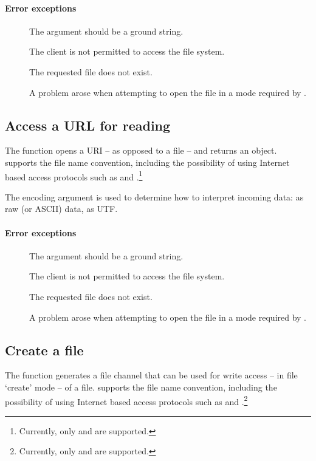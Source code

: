 \paragraph{Error exceptions}
\begin{description}
\item[]
The  argument should be a ground string.
\item[]
The client is not permitted to access the file system.
\item[]
The requested file does not exist.
\item[]
A problem arose when attempting to open the file in a mode required by \go.
\end{description}

\subsection{Access a URL for reading}
\label{io:openURL}
The  function opens a URI -- as opposed to a file -- and returns an  object.  supports the \go file name convention, including the possibility of using Internet based access protocols such as  and .\footnote{Currently, only  and  are supported.}

The encoding argument is used to determine how to interpret incoming data: as raw (or ASCII) data, as UTF.

\paragraph{Error exceptions}
\begin{description}
\item[]
The  argument should be a ground string.
\item[]
The client is not permitted to access the file system.
\item[]
The requested file does not exist.
\item[]
A problem arose when attempting to open the file in a mode required by \go.
\end{description}

\subsection{Create a file}
\label{io:openOutFile}
The  function generates a file channel that can be used for write access -- in file `create' mode -- of a file.  supports the \go file name convention, including the possibility of using Internet based access protocols such as  and .\footnote{Currently, only  and  are supported.}

